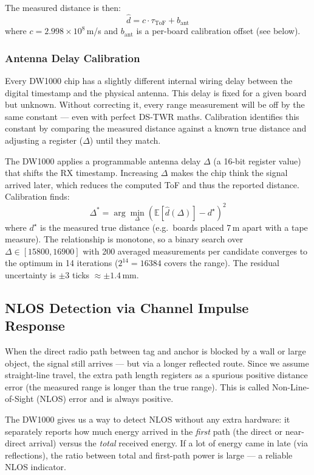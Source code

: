 \documentclass[11pt,a4paper]{article}
\begin{document}
The measured distance is then:
\begin{equation}
\hat{d} = c \cdot \tau_\text{ToF} + b_\text{ant}
\label{eq:dist}
\end{equation}
where $c = 2.998 \times 10^8$\,m/s and $b_\text{ant}$ is a per-board calibration offset (see below).

\subsubsection{Antenna Delay Calibration}

\begin{intubox}
Every DW1000 chip has a slightly different internal wiring delay between the digital timestamp and the physical antenna. This delay is fixed for a given board but unknown. Without correcting it, every range measurement will be off by the same constant --- even with perfect DS-TWR maths. Calibration identifies this constant by comparing the measured distance against a known true distance and adjusting a register ($\Delta$) until they match.
\end{intubox}

The DW1000 applies a programmable antenna delay $\Delta$ (a 16-bit register value) that shifts the RX timestamp. Increasing $\Delta$ makes the chip think the signal arrived later, which reduces the computed ToF and thus the reported distance. Calibration finds:
\[
\Delta^* = \arg\min_\Delta \left(\mathbb{E}\left[\hat{d}(\Delta)\right] - d^\star\right)^2
\]
where $d^\star$ is the measured true distance (e.g.\ boards placed 7\,m apart with a tape measure). The relationship is monotone, so a binary search over $\Delta \in [15800, 16900]$ with 200 averaged measurements per candidate converges to the optimum in 14 iterations ($2^{14} = 16384$ covers the range). The residual uncertainty is $\pm 3$ ticks $\approx \pm 1.4$\,mm.

\subsection{NLOS Detection via Channel Impulse Response}

\begin{intubox}
When the direct radio path between tag and anchor is blocked by a wall or large object, the signal still arrives --- but via a longer reflected route. Since we assume straight-line travel, the extra path length registers as a spurious positive distance error (the measured range is longer than the true range). This is called Non-Line-of-Sight (NLOS) error and is always positive.

The DW1000 gives us a way to detect NLOS without any extra hardware: it separately reports how much energy arrived in the \emph{first} path (the direct or near-direct arrival) versus the \emph{total} received energy. If a lot of energy came in late (via reflections), the ratio between total and first-path power is large --- a reliable NLOS indicator.
\end{intubox}
\end{document}
